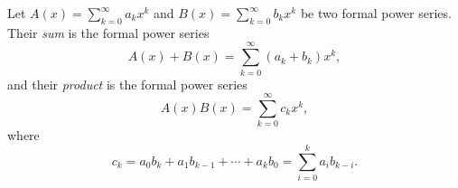 \begin{dfn}
Let $A(x) = \sum_{k=0}^\infty a_k x^k$ and $B(x) = \sum_{k=0}^\infty b_k x^k$ be two formal power series.
Their \emph{sum} is the formal power series
\[
A(x) + B(x) = \sum_{k=0}^\infty (a_k + b_k)x^k,
\]
and their \emph{product} is the formal power series
\[
A(x)B(x) = \sum_{k=0}^\infty c_k x^k,
\]
where
\[
c_k = a_0b_k + a_1b_{k-1} + \cdots + a_kb_0 = \sum_{i=0}^k a_i b_{k-i}.
\]
\end{dfn}